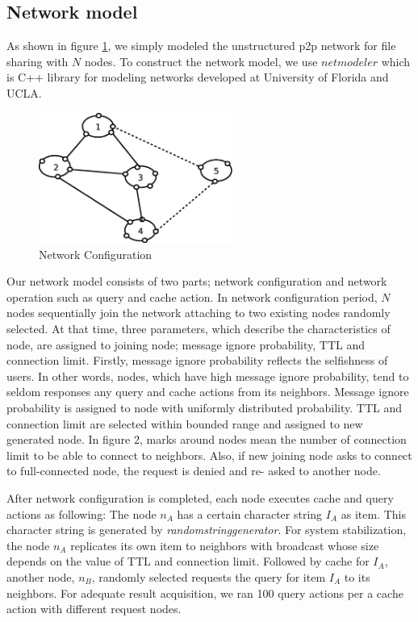 \documentclass[12pt,journal,draftcls,letterpaper,onecolumn]{IEEEtran}
\begin{document}
\subsection{Network model}\label{sec:netmodel}
As shown in figure \ref{fig:network}, we simply modeled the unstructured p2p network for file sharing with
$N$ nodes. To construct the network model, we use $netmodeler$ which is C++ library for
modeling networks developed at University of Florida and UCLA\cite{netmodeler}.

\begin{figure}
\centering
\includegraphics[width=2.5in]{network}
\caption{Network Configuration} 
\label{fig:network}
\end{figure}

Our network model consists of two parts; network configuration and network operation such
as query and cache action. In network configuration period, $N$ nodes sequentially join the
network attaching to two existing nodes randomly selected. At that time, three parameters,
which describe the characteristics of node, are assigned to joining node; message ignore
probability, TTL and connection limit. Firstly, message ignore probability reflects the
selfishness of users. In other words, nodes, which have high message ignore probability, tend
to seldom responses any query and cache actions from its neighbors. Message ignore
probability is assigned to node with uniformly distributed probability. TTL and connection
limit are selected within bounded range and assigned to new generated node. In figure 2,
marks around nodes mean the number of connection limit to be able to connect to neighbors.
Also, if new joining node asks to connect to full-connected node, the request is denied and re-
asked to another node.

After network configuration is completed, each node executes cache and query actions as
following: The node $n_A$ has a certain character string $I_A$ as item. This character string is
generated by \emph{randomstringgenerator}. For system stabilization, the node $n_A$ replicates its own
item to neighbors with broadcast whose size depends on the value of TTL and connection
limit. Followed by cache for $I_A$, another node, $n_B$, randomly selected requests the query for
item $I_A$ to its neighbors. For adequate result acquisition, we ran 100 query actions per a cache
action with different request nodes.
\end{document}
